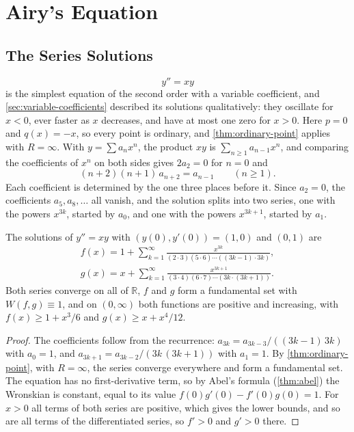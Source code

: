 \section{Airy's Equation}
\label{sec:airy}

\subsection{The Series Solutions}

\begin{equation}
y''=xy
\label{eq:airy}
\end{equation}
is the simplest equation of the second order with a variable coefficient, and \cref{sec:variable-coefficients} described its solutions qualitatively: they oscillate for $x<0$, ever faster as $x$ decreases, and have at most one zero for $x>0$. Here $p=0$ and $q(x)=-x$, so every point is ordinary, and \cref{thm:ordinary-point} applies with $R=\infty$. With $y=\sum a_nx^n$, the product $xy$ is $\sum_{n\ge1}a_{n-1}x^n$, and comparing the coefficients of $x^n$ on both sides gives $2a_2=0$ for $n=0$ and
\[
(n+2)(n+1)\,a_{n+2}=a_{n-1}\qquad(n\ge1).
\]
Each coefficient is determined by the one three places before it. Since $a_2=0$, the coefficients $a_5,a_8,\ldots$ all vanish, and the solution splits into two series, one with the powers $x^{3k}$, started by $a_0$, and one with the powers $x^{3k+1}$, started by $a_1$.

\begin{proposition}
\label{prop:airy-series}
The solutions of $y''=xy$ with $(y(0),y'(0))=(1,0)$ and $(0,1)$ are
\begin{gather*}
f(x)=1+\sum_{k=1}^\infty\frac{x^{3k}}{(2\cdot3)(5\cdot6)\cdots((3k-1)\cdot3k)},\\
g(x)=x+\sum_{k=1}^\infty\frac{x^{3k+1}}{(3\cdot4)(6\cdot7)\cdots(3k\cdot(3k+1))} .
\end{gather*}
Both series converge on all of $\mathbb R$, $f$ and $g$ form a fundamental set with $W(f,g)\equiv1$, and on $(0,\infty)$ both functions are positive and increasing, with $f(x)\ge1+x^3/6$ and $g(x)\ge x+x^4/12$.
\end{proposition}

\begin{proof}
The coefficients follow from the recurrence: $a_{3k}=a_{3k-3}/((3k-1)\,3k)$ with $a_0=1$, and $a_{3k+1}=a_{3k-2}/(3k\,(3k+1))$ with $a_1=1$. By \cref{thm:ordinary-point}, with $R=\infty$, the series converge everywhere and form a fundamental set. The equation has no first-derivative term, so by Abel's formula (\cref{thm:abel}) the Wronskian is constant, equal to its value $f(0)g'(0)-f'(0)g(0)=1$. For $x>0$ all terms of both series are positive, which gives the lower bounds, and so are all terms of the differentiated series, so $f'>0$ and $g'>0$ there.
\end{proof}

